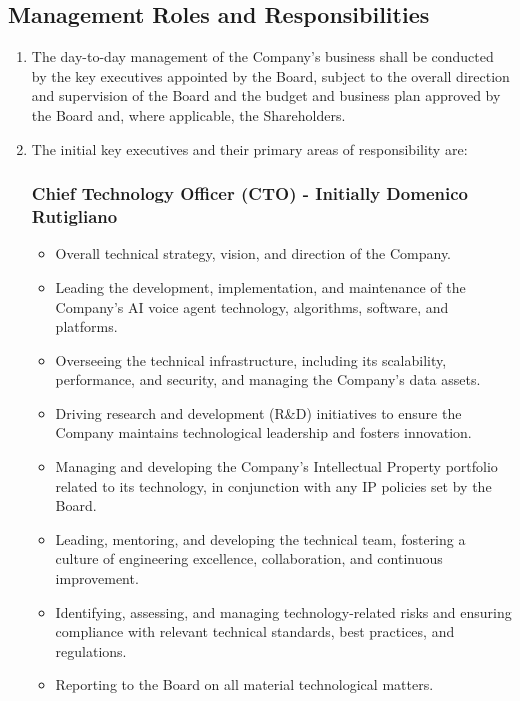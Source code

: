 \subsection{Management Roles and Responsibilities}
\begin{enumerate}[label=(\alph*), wide, labelwidth=!, labelindent=0pt]
\item The day-to-day management of the Company's business shall be conducted by the key executives appointed by the Board, subject to the overall direction and supervision of the Board and the budget and business plan approved by the Board and, where applicable, the Shareholders.
\item The initial key executives and their primary areas of responsibility are:

\subsubsection*{Chief Technology Officer (CTO) - Initially Domenico Rutigliano}
    \begin{itemize}
    \item Overall technical strategy, vision, and direction of the Company.
    \item Leading the development, implementation, and maintenance of the Company's AI voice agent technology, algorithms, software, and platforms.
    \item Overseeing the technical infrastructure, including its scalability, performance, and security, and managing the Company's data assets.
    \item Driving research and development (R\&D) initiatives to ensure the Company maintains technological leadership and fosters innovation.
    \item Managing and developing the Company's Intellectual Property portfolio related to its technology, in conjunction with any IP policies set by the Board.
    \item Leading, mentoring, and developing the technical team, fostering a culture of engineering excellence, collaboration, and continuous improvement.
    \item Identifying, assessing, and managing technology-related risks and ensuring compliance with relevant technical standards, best practices, and regulations.
    \item Reporting to the Board on all material technological matters.
    \end{itemize}


\end{enumerate}

